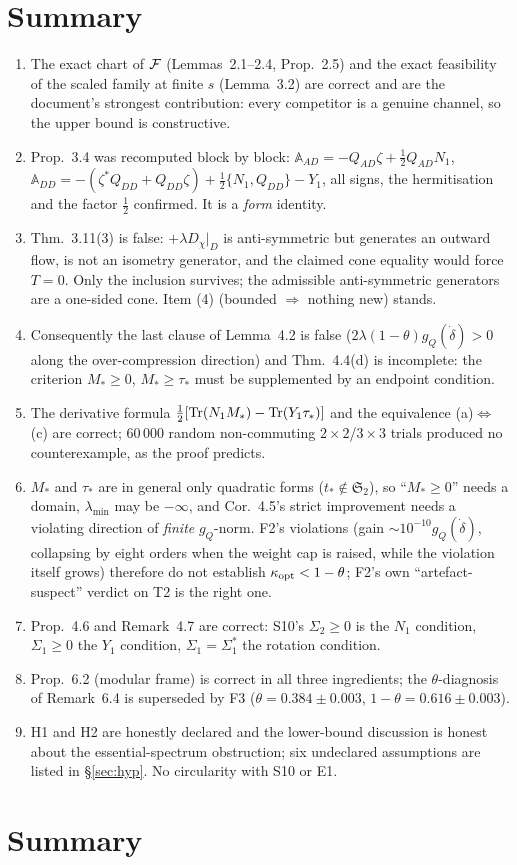 \documentclass[11pt]{article}
\newcommand{\Aop}{\mathbb A}
\newcommand{\Stwo}{\mathfrak S_2}
\begin{document}
\section{Summary}\label{sec:summary}
\begin{enumerate}[leftmargin=1.8em,itemsep=0pt]
\item The exact chart of $\mathcal F$ (Lemmas~2.1--2.4, Prop.~2.5) and the exact feasibility of
 the scaled family at finite $s$ (Lemma~3.2) are correct and are the document's strongest
 contribution: every competitor is a genuine channel, so the upper bound is constructive.
\item Prop.~3.4 was recomputed block by block: $\Aop_{AD}=-Q_{AD}\zeta+\frac12Q_{AD}N_1$,
 $\Aop_{DD}=-(\zeta^*Q_{DD}+Q_{DD}\zeta)+\frac12\{N_1,Q_{DD}\}-Y_1$, all signs, the
 hermitisation and the factor $\frac12$ confirmed.  It is a \emph{form} identity.
\item Thm.~3.11(3) is false: $+\lambda D_\chi|_D$ is anti-symmetric but generates an
 outward flow, is not an isometry generator, and the claimed cone equality would force
 $T=0$.  Only the inclusion survives; the admissible anti-symmetric generators are a
 one-sided cone.  Item (4) (bounded $\Rightarrow$ nothing new) stands.
\item Consequently the last clause of Lemma~4.2 is false ($2\lambda(1-\theta)g_Q(\dot\delta)>0$
 along the over-compression direction) and Thm.~4.4(d) is incomplete: the criterion
 $M_*\ge0$, $M_*\ge\tau_*$ must be supplemented by an endpoint condition.
\item The derivative formula $\frac12[\operatorname{Tr}(N_1M_*)-\operatorname{Tr}(Y_1\tau_*)]$ and the equivalence
 (a)$\Leftrightarrow$(c) are correct; $60\,000$ random non-commuting $2\times2$/$3\times3$
 trials produced no counterexample, as the proof predicts.
\item $M_*$ and $\tau_*$ are in general only quadratic forms ($t_*\notin\Stwo$), so
 ``$M_*\ge0$'' needs a domain, $\lambda_{\min}$ may be $-\infty$, and Cor.~4.5's strict
 improvement needs a violating direction of \emph{finite} $g_Q$-norm.  F2's violations
 (gain $\sim10^{-10}g_Q(\dot\delta)$, collapsing by eight orders when the weight cap is
 raised, while the violation itself grows) therefore do not establish
 $\kappa_{\rm opt}<1-\theta$; F2's own ``artefact-suspect'' verdict on T2 is the right one.
\item Prop.~4.6 and Remark~4.7 are correct: S10's $\Sigma_2\ge0$ is the $N_1$ condition,
 $\Sigma_1\ge0$ the $Y_1$ condition, $\Sigma_1=\Sigma_1^*$ the rotation condition.
\item Prop.~6.2 (modular frame) is correct in all three ingredients; the $\theta$-diagnosis
 of Remark~6.4 is superseded by F3 ($\theta=0.384\pm0.003$, $1-\theta=0.616\pm0.003$).
\item H1 and H2 are honestly declared and the lower-bound discussion is honest about the
 essential-spectrum obstruction; six undeclared assumptions are listed in \S\ref{sec:hyp}.
 No circularity with S10 or E1.
\end{enumerate}

\section{Summary}\label{sec:summary}
\end{document}
